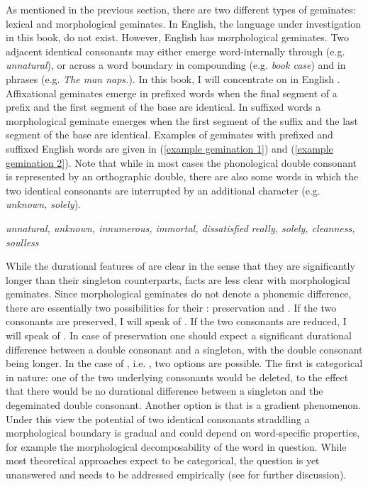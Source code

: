 As mentioned in the previous section, there are two different types of geminates: lexical and  morphological geminates. In English, the language under investigation in this book,  do not exist. However, English has  morphological geminates. Two adjacent identical consonants may either emerge word-internally through  (e.g. \textit{unnatural}), or across a word boundary in compounding (e.g. \textit{book case}) and in phrases (e.g. \textit{The man naps.}). In this book, I will concentrate on  in English . Affixational geminates emerge in prefixed words when the final segment of a prefix and the first segment of the base are identical. In suffixed words a {morphological geminate} emerges when the first segment of the suffix and the last segment of the base are identical. Examples of geminates with prefixed and suffixed English words are given in (\ref{example gemination 1}) and (\ref{example gemination 2}). Note that while in most cases the phonological double consonant is represented by an orthographic double, there are also some words in which the two identical consonants are interrupted by  an additional character (e.g. \textit{unknown, solely}).

\begin{exe} 
	\ex \label{example gemination 1} \textit{unnatural, unknown, innumerous, immortal, dissatisfied}
	\ex \label{example gemination 2}\textit{really, solely, cleanness, soulless}
\end{exe}

While the durational features of  are clear in the sense that they are significantly longer than their singleton counterparts, facts are less clear with  morphological geminates. Since  morphological geminates do not denote a phonemic difference, there are essentially two possibilities for their : preservation and . If the two consonants are preserved, I will speak of . If the two consonants are reduced, I will speak of . 
In case of preservation one should expect a significant durational difference between a double consonant and a singleton, with the double consonant being longer.	
In the case of , i.e. , two options are possible. The first is categorical in nature: one of the two underlying consonants would be deleted, to the effect that there would be no durational difference between a singleton and the degeminated double consonant.
Another option is that  is a gradient phenomenon. Under this view the potential  of two identical consonants straddling a morphological boundary is gradual and could depend on word-specific properties, for example the morphological decomposability of the word in question. 
While most theoretical approaches expect  to be categorical, the question is yet unanswered and needs to be addressed empirically (see  for further discussion).

